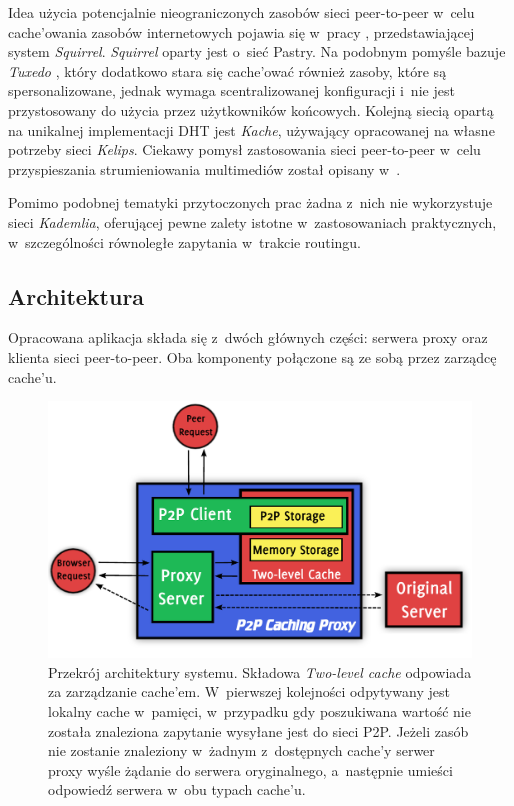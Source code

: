 \documentclass[a4paper,11pt]{scrartcl}
\newcommand{\s}{ }
\newcommand{\kesz}{cache}
\newcommand{\keszy}{cache'y}
\newcommand{\keszem}{cache'em}
\newcommand{\keszu}{cache'u}
\newcommand{\keszowac}{cache'ować}
\newcommand{\keszowania}{cache'owania}
\begin{document}
Idea użycia potencjalnie nieograniczonych zasobów sieci peer-to-peer w~celu \keszowania\s zasobów internetowych pojawia się w~pracy \cite{iyer2002squirrel, clevenot2004simple}, przedstawiającej system \textit{Squirrel}. \textit{Squirrel} oparty jest o~sieć Pastry\cite{rowstron2001pastry}. 
Na podobnym pomyśle bazuje \textit{Tuxedo} \cite{shi2003tuxedo}, który dodatkowo stara się \keszowac\s również zasoby, które są spersonalizowane, jednak wymaga scentralizowanej konfiguracji i~nie jest przystosowany do użycia przez użytkowników końcowych. 
Kolejną siecią opartą na unikalnej implementacji DHT jest \textit{Kache}\cite{linga2004kache}, używający opracowanej na własne potrzeby sieci \textit{Kelips}.
Ciekawy pomysł zastosowania sieci peer-to-peer w~celu przyspieszania strumieniowania multimediów został opisany w~\cite{guo2006design}.

Pomimo podobnej tematyki przytoczonych prac żadna z~nich nie wykorzystuje sieci \textit{Kademlia}, oferującej pewne zalety istotne w~zastosowaniach praktycznych, w~szczególności równoległe zapytania w~trakcie routingu.

\subsection{Architektura}
\label{sect_architecture}
Opracowana aplikacja składa się z~dwóch głównych części: serwera proxy oraz klienta sieci peer-to-peer. Oba komponenty połączone są ze sobą przez zarządcę \keszu.

\begin{figure}[h!]
\centering
\includegraphics[width=0.9\linewidth]{img/architecture.pdf}
\caption{Przekrój architektury systemu. Składowa \textit{Two-level cache} odpowiada za zarządzanie \keszem. W~pierwszej kolejności odpytywany jest lokalny \kesz\s w~pamięci, w~przypadku gdy poszukiwana wartość nie została znaleziona zapytanie wysyłane jest do sieci P2P. Jeżeli zasób nie zostanie znaleziony w~żadnym z~dostępnych \keszy\s serwer proxy wyśle żądanie do serwera oryginalnego, a~następnie umieści odpowiedź serwera w~obu typach \keszu.}
\label{fig_architecture}
\end{figure}
\end{document}
